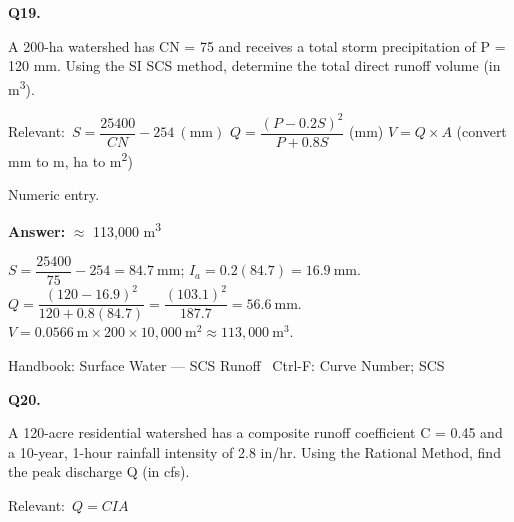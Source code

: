 \documentclass[11pt]{article}
\begin{document}
\vspace{9pt}
\filbreak
\textbf{\color{accent}Q19.}\par\vspace{2pt}
A 200-ha watershed has CN = 75 and receives a total storm precipitation of P = 120 mm. Using the SI SCS method, determine the total direct runoff volume (in m\textsuperscript{3}).\par\vspace{3pt}
{\small\color{soft}Relevant:}\ $S = \dfrac{25400}{CN} - 254\ (\mathrm{mm})$ \quad $Q = \dfrac{(P - 0.2S)^{2}}{P + 0.8S}$ (mm) \quad $V = Q \times A$ (convert mm to m, ha to m\textsuperscript{2})\par\vspace{3pt}
{\small\color{soft}Numeric entry.}\par\vspace{3pt}
\vspace{2pt}\par\noindent\colorbox{boxbg}{\parbox{\dimexpr\linewidth-2\fboxsep\relax}{%
\vspace{2pt}\textbf{Answer:} $\approx$ 113,000 m\textsuperscript{3}\par\vspace{2pt}
{\small $S = \dfrac{25400}{75} - 254 = 84.7\ \mathrm{mm}$; $I_a = 0.2(84.7) = 16.9\ \mathrm{mm}$. $Q = \dfrac{(120-16.9)^{2}}{120 + 0.8(84.7)} = \dfrac{(103.1)^{2}}{187.7} = 56.6\ \mathrm{mm}$. $V = 0.0566\ \mathrm{m} \times 200 \times 10{,}000\ \mathrm{m^{2}} \approx 113{,}000\ \mathrm{m^{3}}$.}\par\vspace{2pt}
{\footnotesize\color{soft}Handbook: Surface Water --- SCS Runoff \textbullet\ Ctrl-F: Curve Number; SCS}\vspace{2pt}
}}
\vspace{9pt}
\filbreak
\textbf{\color{accent}Q20.}\par\vspace{2pt}
A 120-acre residential watershed has a composite runoff coefficient C = 0.45 and a 10-year, 1-hour rainfall intensity of 2.8 in/hr. Using the Rational Method, find the peak discharge Q (in cfs).\par\vspace{3pt}
{\small\color{soft}Relevant:}\ $Q = CIA$\par\vspace{3pt}
\end{document}

